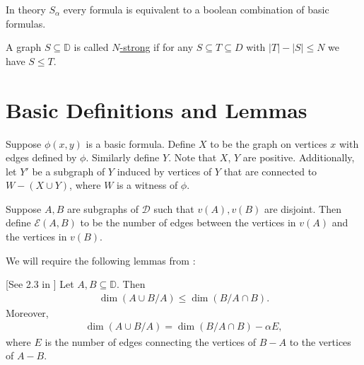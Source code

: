 \documentclass{amsart}
\newcommand{\defn}{\underline}
\newcommand{\DB}{\mathbb D}
\newcommand{\E}{\mathscr E}
\newcommand{\B}{B}
\newcommand{\D}{\mathcal D}
\newcommand{\X}{X}
\newcommand{\Y}{Y}
\begin{document}
\begin{Theorem} 
  In theory $S_\alpha$ every formula is equivalent to a boolean combination of basic formulas.
\end{Theorem}

\begin{Definition}
  A graph $S \subseteq \DB$ is called \defn{$N$-strong} if for any $S \subseteq T \subseteq D$ with $|T| - |S| \leq N$ we have $S \leq T$.
\end{Definition}

\section{Basic Definitions and Lemmas}

\begin{Definition} \label{def_basic}
  Suppose $\phi(x, y)$ is a basic formula.
  Define $\X$ to be the graph on vertices $x$ with edges defined by $\phi$.
  Similarly define $\Y$.
  Note that $\X$, $\Y$ are positive.
  Additionally, let $\Y'$ be a subgraph of $\Y$ induced by vertices of $\Y$ that are connected to $W - (X \cup Y)$, where $W$ is a witness of $\phi$.
\end{Definition}

\begin{Definition} \label{def_e}
  Suppose $A, B$ are subgraphs of $\D$ such that $v(A), v(B)$ are disjoint.
  Then define $\E(A, B)$ to be the number of edges between the vertices in $v(A)$ and the vertices in $v(B)$.
\end{Definition}

We will require the following lemmas from \cite{laskowski}:

\begin{Lemma} \label{diamond} [See 2.3 in \cite{laskowski}]
  Let $A, B \subseteq \DB$.
  Then
  \begin{align*}
    \dim(A \cup B / A) \leq \dim(\B / A \cap B).
  \end{align*}
  Moreover, 
  \begin{align*}
    \dim(A \cup B / A) = \dim(\B / A \cap B) - \alpha E,
  \end{align*}
  where $E$ is the number of edges connecting the vertices of $B - A$ to the vertices of $A - B$.
\end{Lemma}
\end{document}
